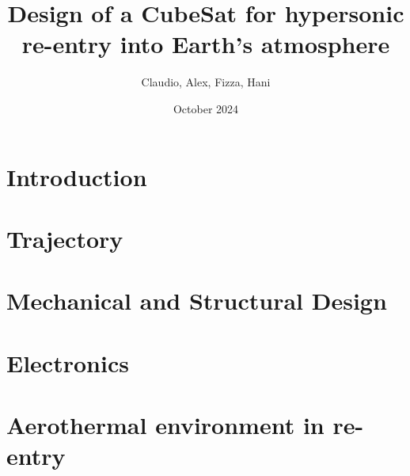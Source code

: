 \documentclass[hidelinks]{article}
\title{Design of a CubeSat for hypersonic re-entry into Earth's atmosphere}
\author{Claudio, Alex, Fizza, Hani}
\date{October 2024}
\begin{document}
\maketitle
%
\section{Introduction}
%
\section{Trajectory}
%
\section{Mechanical and Structural Design}
%
\section{Electronics}
%
\section{Aerothermal environment in re-entry}
%
\end{document}
